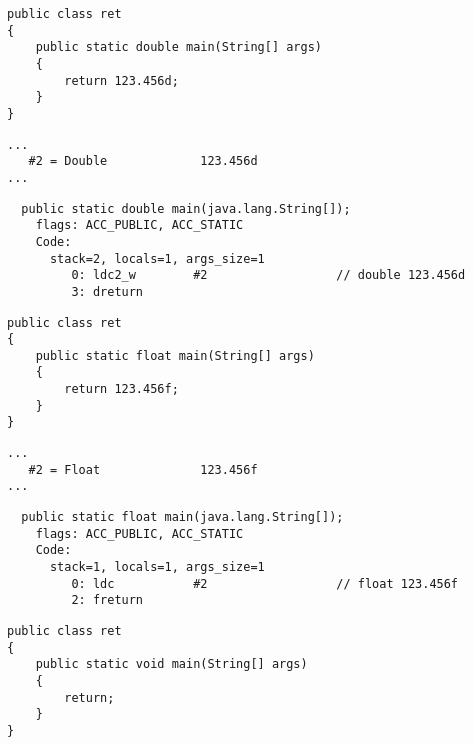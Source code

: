 \begin{lstlisting}
public class ret
{
	public static double main(String[] args)
	{
		return 123.456d;
	}
}
\end{lstlisting}

\begin{lstlisting}[caption=Constant pool]
...
   #2 = Double             123.456d
...
\end{lstlisting}

\begin{lstlisting}
  public static double main(java.lang.String[]);
    flags: ACC_PUBLIC, ACC_STATIC
    Code:
      stack=2, locals=1, args_size=1
         0: ldc2_w        #2                  // double 123.456d
         3: dreturn       
\end{lstlisting}



\begin{lstlisting}
public class ret
{
	public static float main(String[] args)
	{
		return 123.456f;
	}
}
\end{lstlisting}

\begin{lstlisting}[caption=Constant pool]
...
   #2 = Float              123.456f
...
\end{lstlisting}

\begin{lstlisting}
  public static float main(java.lang.String[]);
    flags: ACC_PUBLIC, ACC_STATIC
    Code:
      stack=1, locals=1, args_size=1
         0: ldc           #2                  // float 123.456f
         2: freturn       
\end{lstlisting}



\begin{lstlisting}
public class ret
{
	public static void main(String[] args) 
	{
		return;
	}
}
\end{lstlisting}

